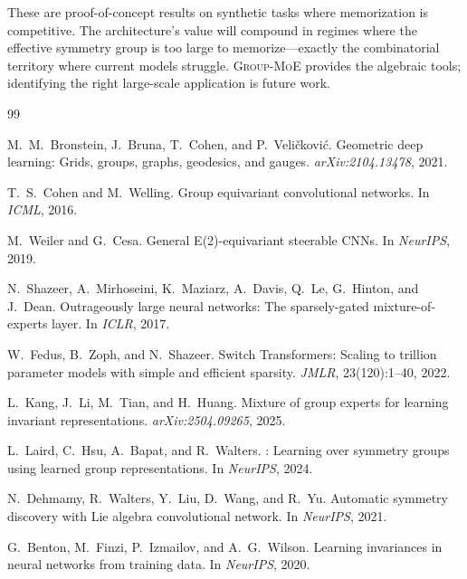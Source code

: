 \documentclass[10pt, letterpaper]{article}
\newcommand{\gmoe}{\textsc{Group-MoE}}
\begin{document}
These are proof-of-concept results on synthetic tasks where memorization is competitive. The architecture's value will compound in regimes where the effective symmetry group is too large to memorize---exactly the combinatorial territory where current models struggle. \gmoe{} provides the algebraic tools; identifying the right large-scale application is future work.

\begin{thebibliography}{99}

M.~M.~Bronstein, J.~Bruna, T.~Cohen, and P.~Veli\v{c}kovi\'{c}.
\newblock Geometric deep learning: Grids, groups, graphs, geodesics, and gauges.
\newblock \emph{arXiv:2104.13478}, 2021.

T.~S.~Cohen and M.~Welling.
\newblock Group equivariant convolutional networks.
\newblock In \emph{ICML}, 2016.

M.~Weiler and G.~Cesa.
\newblock General {E(2)}-equivariant steerable {CNNs}.
\newblock In \emph{NeurIPS}, 2019.

N.~Shazeer, A.~Mirhoseini, K.~Maziarz, A.~Davis, Q.~Le, G.~Hinton, and J.~Dean.
\newblock Outrageously large neural networks: The sparsely-gated mixture-of-experts layer.
\newblock In \emph{ICLR}, 2017.

W.~Fedus, B.~Zoph, and N.~Shazeer.
\newblock Switch {T}ransformers: Scaling to trillion parameter models with simple and efficient sparsity.
\newblock \emph{JMLR}, 23(120):1--40, 2022.

L.~Kang, J.~Li, M.~Tian, and H.~Huang.
\newblock Mixture of group experts for learning invariant representations.
\newblock \emph{arXiv:2504.09265}, 2025.

L.~Laird, C.~Hsu, A.~Bapat, and R.~Walters.
: Learning over symmetry groups using learned group representations.
\newblock In \emph{NeurIPS}, 2024.

N.~Dehmamy, R.~Walters, Y.~Liu, D.~Wang, and R.~Yu.
\newblock Automatic symmetry discovery with {L}ie algebra convolutional network.
\newblock In \emph{NeurIPS}, 2021.

G.~Benton, M.~Finzi, P.~Izmailov, and A.~G.~Wilson.
\newblock Learning invariances in neural networks from training data.
\newblock In \emph{NeurIPS}, 2020.


\end{thebibliography}
\end{document}
